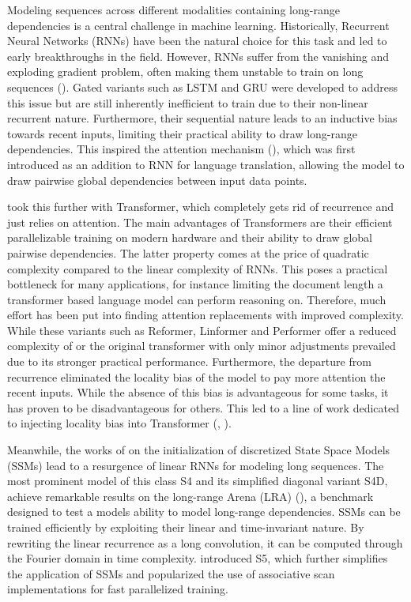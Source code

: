 \documentclass{article} \usepackage{iclr2024_conference,times}
\begin{document}
Modeling sequences across different modalities containing long-range dependencies is a central challenge in machine learning. Historically, Recurrent Neural Networks (RNNs) have been the natural choice for this task and led to early breakthroughs in the field. However, RNNs suffer from the vanishing and exploding gradient problem, often making them unstable to train on long sequences (\cite{hochreiter1997lstm}). Gated variants such as LSTM and GRU were developed to address this issue but are still inherently inefficient to train due to their non-linear recurrent nature. Furthermore, their sequential nature  leads to an inductive bias towards recent inputs, limiting their practical ability to draw long-range dependencies. This inspired the attention mechanism (\cite{garg2019jointly}), which was first introduced as an addition to RNN for language translation, allowing the model to draw pairwise global dependencies between input data points. 

\cite{vaswani2023attention} took this further with Transformer, which completely gets rid of recurrence and just relies on attention. The main advantages of Transformers are their efficient parallelizable training on modern hardware and their ability to draw global pairwise dependencies. The latter property comes at the price of quadratic complexity  compared to the linear complexity  of RNNs. This poses a practical bottleneck for many applications, for instance limiting the document length a transformer based language model can perform reasoning on. Therefore, much effort has been put into finding attention replacements with improved complexity. While these variants such as Reformer, Linformer and Performer offer a reduced complexity of  or  the original transformer with only minor adjustments prevailed due to its stronger practical performance.
Furthermore, the departure from recurrence eliminated the locality bias of the model to pay more attention the recent inputs. While the absence of this bias is advantageous for some tasks, it has proven to be disadvantageous for others. This led to a line of work dedicated to injecting locality bias into Transformer (\cite{ma2023mega}, \cite{huang2023encoding}). 

Meanwhile, the works of \cite{gu2022efficiently} on the initialization of discretized State Space Models (SSMs) lead to a resurgence of linear RNNs for modeling long sequences. The most prominent model of this class S4 and its simplified diagonal variant S4D, achieve remarkable results on the long-range Arena (LRA) (\cite{tay2020long}), a benchmark designed to test a models ability to model long-range dependencies. SSMs can be trained efficiently by exploiting their linear and time-invariant nature. By rewriting the linear recurrence as a long convolution, it can be computed through the Fourier domain in  time complexity. \cite{smith2023simplified} introduced S5, which further simplifies the application of SSMs and popularized the use of associative scan implementations for fast parallelized training.
\end{document}
